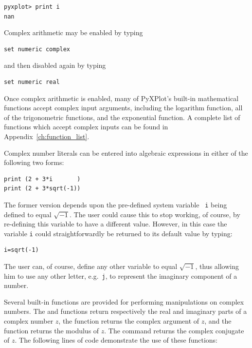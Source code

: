 \begin{verbatim}
pyxplot> print i
nan
\end{verbatim}

Complex arithmetic may be enabled by typing

\begin{verbatim}
set numeric complex
\end{verbatim}

\noindent and then disabled again by typing

\begin{verbatim}
set numeric real
\end{verbatim}

Once complex arithmetic is enabled, many of PyXPlot's built-in mathematical
functions accept complex input arguments, including the logarithm function, all
of the trigonometric functions, and the exponential function.  A complete list
of functions which accept complex inputs can be found in
Appendix~\ref{ch:function_list}.

Complex number literals can be entered into algebraic expressions in either of
the following two forms:

\begin{verbatim}
print (2 + 3*i       )
print (2 + 3*sqrt(-1))
\end{verbatim}

\noindent The former version depends upon the pre-defined system variable {\tt
i} being defined to equal $\sqrt{-1}$. The user could cause this to stop working,
of course, by re-defining this variable to have a different value.  However, in
this case the variable {\tt i} could straightforwardly be returned to its
default value by typing:

\begin{verbatim}
i=sqrt(-1)
\end{verbatim}

\noindent The user can, of course, define any other variable to equal
$\sqrt{-1}$, thus allowing him to use any other letter, e.g.\ {\tt j}, to
represent the imaginary component of a number.

Several built-in functions are provided for performing manipulations on complex
numbers. The  and  functions return respectively
the real and imaginary parts of a complex number $z$, the 
function returns the complex argument of $z$, and the  function
returns the modulus of $z$.  The  command returns the
complex conjugate of $z$. The following lines of code demonstrate the use of
these functions:

